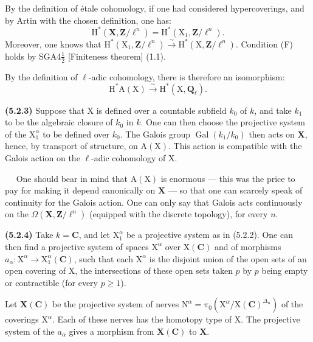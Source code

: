 \documentclass[11pt,leqno]{article}
\newcommand{\Page}[1]{\ifvmode\noindent\else\unskip\ \fi{\footnotesize\textcolor{gray}{[p.\,#1]}}\ \ignorespaces}
\begin{document}
By the definition of étale cohomology, if one had considered hypercoverings, and by Artin with the chosen definition, one has:
\[
\mathrm{H}^*(\mathbf{X},\mathbf{Z}/\ell^n)
=\mathrm{H}^*(\mathrm{X}_1,\mathbf{Z}/\ell^n).
\]
Moreover, one knows that \(\mathrm{H}^*(\mathrm{X}_1,\mathbf{Z}/\ell^n)\xrightarrow{\sim}\mathrm{H}^*(\mathrm{X},\mathbf{Z}/\ell^n)\). Condition (F) holds by SGA4\(\frac{1}{2}\) [Finiteness theorem] (1.1).

By the definition of \(\ell\)-adic cohomology, there is therefore an isomorphism:
\[
\mathrm{H}^*\mathrm{A}(\mathrm{X})
\xrightarrow{\sim}
\mathrm{H}^*(\mathrm{X},\mathbf{Q}_{\ell}).
\]

\textbf{(5.2.3)} Suppose that \(\mathrm{X}\) is defined over a countable subfield \(k_0\) of \(k\), and take \(k_1\) to be the algebraic closure of \(k_0\) in \(k\). One can then choose the projective system of the \(\mathrm{X}_1^{\alpha}\) to be defined over \(k_0\). The Galois group \(\operatorname{Gal}(k_1/k_0)\) then acts on \(\mathbf{X}\), hence, by transport of structure, on \(\mathrm{A}(\mathrm{X})\). This action is compatible with the Galois action on the \(\ell\)-adic cohomology of \(\mathrm{X}\).

\Page{239}
One should bear in mind that \(\mathrm{A}(\mathrm{X})\) is enormous — this was the price to pay for making it depend canonically on \(\mathbf{X}\) — so that one can scarcely speak of continuity for the Galois action. One can only say that Galois acts continuously on the \(\Omega(\mathbf{X},\mathbf{Z}/\ell^n)\) (equipped with the discrete topology), for every \(n\).

\textbf{(5.2.4)} Take \(k=\mathbf{C}\), and let \(\mathrm{X}_1^{\alpha}\) be a projective system as in (5.2.2). One can then find a projective system of spaces \(\mathrm{X}^{\alpha}\) over \(\mathrm{X}(\mathbf{C})\) and of morphisms \(a_{\alpha}:\mathrm{X}^{\alpha}\to\mathrm{X}_1^{\alpha}(\mathbf{C})\), such that each \(\mathrm{X}^{\alpha}\) is the disjoint union of the open sets of an open covering of \(\mathrm{X}\), the intersections of these open sets taken \(p\) by \(p\) being empty or contractible (for every \(p\geq1\)).

Let \(\mathbf{X}(\mathbf{C})\) be the projective system of nerves \(\mathrm{N}^{\alpha}=\pi_0(\mathrm{X}^{\alpha}/\mathrm{X}(\mathbf{C})^{\Delta_n})\) of the coverings \(\mathrm{X}^{\alpha}\). Each of these nerves has the homotopy type of \(\mathrm{X}\). The projective system of the \(a_{\alpha}\) gives a morphism from \(\mathbf{X}(\mathbf{C})\) to \(\mathbf{X}\).
\end{document}
